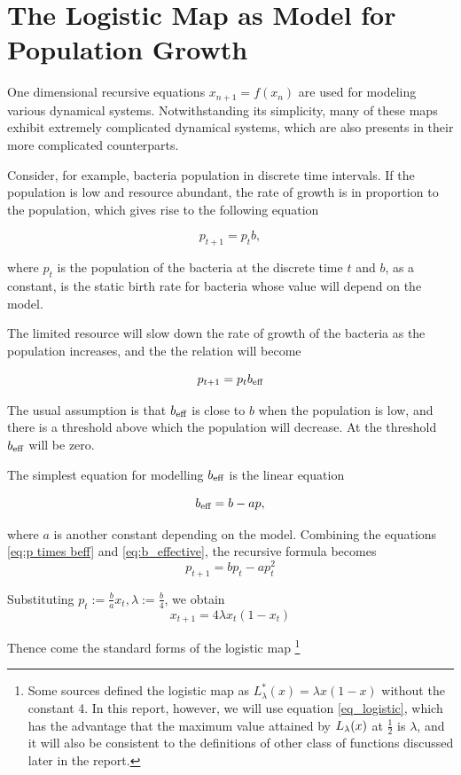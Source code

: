 \section{The Logistic Map as Model for Population Growth}

One dimensional recursive equations $x_{n+1} = f(x_n)$ are used for modeling various dynamical systems. 
Notwithstanding its simplicity, many of these maps exhibit extremely complicated dynamical systems, which are also presents in their more complicated counterparts.

Consider, for example, bacteria population in discrete time intervals. 
If the population is low and resource abundant, the rate of growth is in proportion to the population, which gives rise to the following equation

\begin{equation}\label{eq:1d iterative map}
p_{t+1} = p_{t} b,
\end{equation}

where $p_{t}$ is the population of the bacteria at the discrete time $t$ and $b$, as a constant, is the static birth rate for bacteria whose value will depend on the model.

The limited resource will slow down the rate of growth of the bacteria as the population increases, and the the relation will become 

\begin{equation}\label{eq:p times beff}
	p_{t+1} =  p_{t} b_\text{eff}
\end{equation}

The usual assumption is that $b_\text{eff}$ is close to $b$ when the population is low, and there is a threshold above which the population will decrease. 
At the threshold $b_\text{eff}$ will be zero.

The simplest equation for modelling $b_\text{eff}$ is the linear equation

\begin{equation} \label{eq:b_effective}
b_\text{eff} = b - ap,
\end{equation}

where $a$ is another constant depending on the model.
Combining the equations \eqref{eq:p times beff} and \eqref{eq:b_effective}, the recursive formula becomes 
$$
p_{t+1}  = b p_t - ap_t^2
$$

Substituting $p_{t} := \frac{b}{a} x_{t}, \lambda := \frac{b}{4}$, we obtain
$$
x_{t+1} = 4 \lambda x_t(1-x_t) 
$$

Thence come the standard forms of the logistic map
\footnote{
Some sources defined the logistic map as $L^*_{\lambda}(x) = \lambda x(1-x)$ without the constant 4. 
In this report, however, we will use equation \ref{eq_logistic}, which has the advantage that the maximum value attained by $L_{\lambda}(x)$ at $\frac{1}{2}$ is $\lambda$, and it will also be consistent to the definitions of other class of functions discussed later in the report.
}

